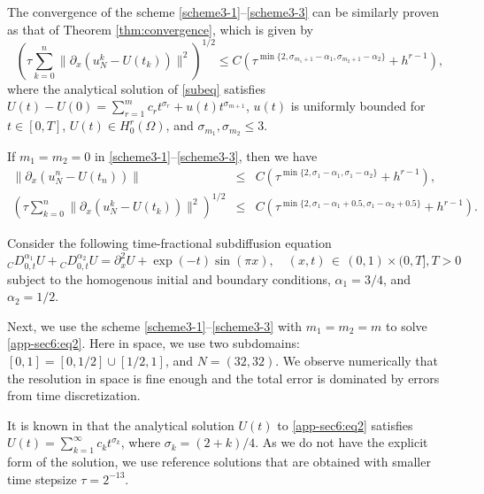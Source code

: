 \documentclass[10pt]{siamltex}
\newcommand{\px}[1][x]{\partial_{#1}}
\begin{document}
The  convergence of the scheme \eqref{scheme3-1}--\eqref{scheme3-3}  can be similarly
proven as that of Theorem \ref{thm:convergence}, which is given by
$$\left(\tau\sum_{k=0}^n\|\px (u_N^{k}-U(t_k))\|^2\right)^{1/2}
\leq C\left(\tau^{\min\{2,\sigma_{m_1+1}-{\alpha_1},\sigma_{m_2+1}-{\alpha_2}\}}
+ h^{r-1}\right),$$
where the analytical solution of \eqref{subeq} satisfies
$U(t)-U(0)=\sum_{r=1}^{m}c_rt^{\sigma_r}+u(t)t^{\sigma_{m+1}}$, $u(t)$ is uniformly bounded
for $t\in[0,T]$, $U(t)\in H_0^r(\Omega)$,
 and {$\sigma_{m_1},\sigma_{m_2}\leq 3$}.

\begin{remark}
If $m_1=m_2=0$ in \eqref{scheme3-1}--\eqref{scheme3-3}, then we have
\begin{eqnarray*}
\|\px (u_N^{n}-U(t_n))\|
&\leq& C\left(\tau^{\min\{2,\sigma_{1}-{\alpha_1},\sigma_{1}-{\alpha_2}\}}+ h^{r-1}\right),\\
\left(\tau\sum_{k=0}^n\|\px (u_N^{k}-U(t_k))\|^2\right)^{1/2}
&\leq& C\left(\tau^{\min\{2,\sigma_{1}-{\alpha_1}+0.5,\sigma_{1}-{\alpha_2}+0.5\}}+h^{r-1}\right).
\end{eqnarray*}
\end{remark}

\begin{example}\label{exm:throw-at-far-field}
Consider the following time-fractional subdiffusion equation
\begin{equation}\label{app-sec6:eq2}
{}_{C}D^{\alpha_1}_{0,t}U+{}_{C}D^{\alpha_2}_{0,t}U
=\px^2U+\exp(-t){\sin(\pi x)},{\quad}(x,t){\,\in\,}(0,1){\times}(0,T],T>0
\end{equation}
subject to the homogenous initial and boundary conditions, $\alpha_1=3/4$, and $\alpha_2 =1/2$.
\end{example}



Next, we use the scheme \eqref{scheme3-1}--\eqref{scheme3-3} with $m_1=m_2=m$
to solve \eqref{app-sec6:eq2}.
Here in space, we use two subdomains: $[0,1]=[0,1/2]\cup[1/2,1]$, and $N=(32,32)$. We observe
numerically that the resolution in space is fine enough and the total error is
dominated by errors from time discretization.

It is known in \cite[p. 183]{Diethelm-B10}   that the analytical solution $U(t)$
to \eqref{app-sec6:eq2} satisfies
$U(t)=\sum_{k=1}^{\infty}c_kt^{\sigma_k}$, where $\sigma_k=(2+k)/4$.
As we do not have the explicit form of the solution, we use reference solutions that are obtained
with smaller time stepsize $\tau=2^{-13}$.
\end{document}
